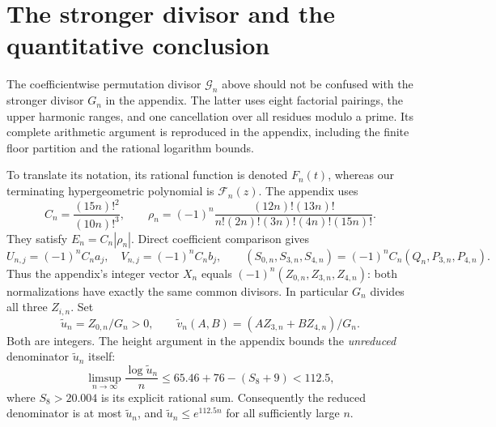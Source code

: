 \documentclass[11pt]{article}
\newcommand{\F}{\mathcal F}
\begin{document}
\section{The stronger divisor and the quantitative conclusion}
The coefficientwise permutation divisor $\mathcal G_n$ above should not
be confused with the stronger divisor $G_n$ in the appendix. The latter
uses eight factorial pairings, the upper harmonic ranges, and one
cancellation over all residues modulo a prime. Its complete arithmetic
argument is reproduced in the appendix, including the finite floor
partition and the rational logarithm bounds.

To translate its notation, its rational function is denoted $F_n(t)$,
whereas our terminating hypergeometric polynomial is $\F_n(z)$.
The appendix uses
\[
 C_n=\frac{(15n)!^2}{(10n)!^3},\qquad
 \rho_n=(-1)^n\frac{(12n)!(13n)!}
 {n!(2n)!(3n)!(4n)!(15n)!}.
\]
They satisfy $E_n=C_n|\rho_n|$. Direct coefficient comparison gives
\[
 U_{n,j}=(-1)^n C_na_j,\quad V_{n,j}=(-1)^n C_nb_j,
 \qquad (S_{0,n},S_{3,n},S_{4,n})
 =(-1)^n C_n(Q_n,P_{3,n},P_{4,n}).
\]
Thus the appendix's integer vector $X_n$ equals
$(-1)^n(Z_{0,n},Z_{3,n},Z_{4,n})$: both normalizations have exactly the
same common divisors. In particular $G_n$ divides all three $Z_{i,n}$.
Set
\[
 \widetilde u_n=Z_{0,n}/G_n>0,\qquad
 \widetilde v_n(A,B)=(AZ_{3,n}+BZ_{4,n})/G_n.
\]
Both are integers. The height argument in the appendix bounds the
\emph{unreduced} denominator $\widetilde u_n$ itself:
\[
 \limsup_{n\to\infty}\frac{\log\widetilde u_n}{n}
 \leq65.46+76-(S_8+9)<112.5,
\]
where $S_8>20.004$ is its explicit rational sum. Consequently the
reduced denominator is at most $\widetilde u_n$, and
$\widetilde u_n\leq e^{112.5n}$ for all sufficiently large $n$.
\end{document}
